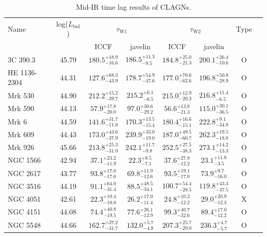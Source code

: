 \documentclass[linenumbers]{aastex631}
\begin{document}
\begin{table}
\renewcommand{\arraystretch}{1.5}
 \caption{Mid-IR time lag results of CLAGNs.
}
 \label{table_lag}
 \begin{center}
 \begin{tabular}{lccccccc}
 \hline\hline
Name & log($L_\mathrm{bol}$) & \multicolumn{2}{c}{$\tau_\mathrm{W1}$} & \multicolumn{2}{c}{$\tau_\mathrm{W2}$} &Type \\ 
      &                      &   ICCF     &  {\sc javelin}   &    ICCF & {\sc javelin} &   \\ \hline 
3C 390.3 & 45.79 & $180.5_{-16.6}^{+18.9}$ & $186.5_{-9.5}^{+11.3}$ & $184.8_{-21.3}^{+25.0}$ & $200.1_{-10.6}^{+26.4}$ & O \\
HE 1136-2304 & 44.31 & $127.6_{-43.9}^{+68.3}$ & $178.7_{-47.6}^{+54.9}$ & $177.0_{-62.6}^{+70.6}$ & $196.8_{-28.9}^{+50.8}$ & O \\
Mrk 530 & 44.90 & $212.2_{-39.7}^{+15.2}$ & $215.2_{-6.5}^{+6.1}$ & $215.0_{-20.3}^{+12.9}$ & $216.8_{-6.5}^{+11.4}$ & O \\
Mrk 590 & 44.13 & $57.9_{-20.0}^{+17.8}$ & $97.0_{-29.2}^{+30.6}$ & $56.6_{-21.3}^{+13.8}$ & $115.0_{-36.5}^{+30.1}$ & O \\
Mrk 6 & 44.59 & $141.6_{-11.0}^{+31.7}$ & $170.3_{-15.4}^{+13.5}$ & $180.4_{-15.1}^{+16.6}$ & $222.8_{-34.8}^{+9.1}$ & O \\
Mrk 609 & 44.43 & $173.0_{-37.9}^{+43.6}$ & $239.9_{-19.0}^{+33.0}$ & $187.0_{-60.7}^{+49.5}$ & $262.3_{-18.8}^{+19.5}$ & O \\
Mrk 926 & 45.66 & $213.8_{-31.0}^{+25.3}$ & $242.1_{-9.8}^{+11.7}$ & $252.5_{-38.3}^{+27.5}$ & $273.1_{-13.3}^{+14.2}$ & O \\
NGC 1566 & 42.94 & $37.1_{-11.9}^{+23.2}$ & $22.3_{-7.1}^{+8.5}$ & $37.6_{-12.2}^{+27.8}$ & $23.1_{-3.5}^{+11.8}$ & O \\
NGC 2617 & 43.77 & $93.8_{-17.6}^{+17.0}$ & $69.8_{-12.6}^{+11.9}$ & $93.5_{-17.0}^{+19.1}$ & $73.9_{-16.0}^{+9.7}$ & O \\
NGC 3516 & 44.19 & $91.1_{-31.4}^{+64.0}$ & $88.5_{-34.1}^{+48.5}$ & $100.7_{-28.5}^{+54.4}$ & $119.8_{-37.5}^{+43.3}$ & O \\
NGC 4051 & 42.61 & $22.3_{-10.0}^{+10.4}$ & $26.2_{-11.4}^{+17.0}$ & $24.8_{-12.2}^{+10.2}$ & $29.0_{-12.3}^{+20.9}$ & X \\
NGC 4151 & 44.08 & $74.4_{-19.5}^{+40.8}$ & $77.6_{-12.9}^{+26.1}$ & $99.3_{-32.6}^{+40.7}$ & $89.4_{-12.2}^{+17.0}$ & O \\
NGC 5548 & 44.66 & $162.7_{-31.7}^{+37.2}$ & $132.0_{-4.8}^{+5.7}$ & $207.3_{-29.0}^{+25.7}$ & $236.3_{-5.7}^{+4.7}$ & O \\

\end{tabular}
\end{center}
\end{table}
\end{document}
